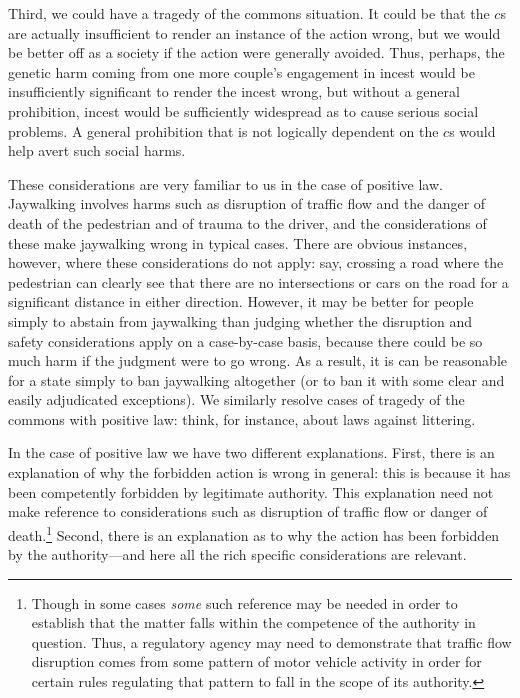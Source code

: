 Third, we could have a tragedy of the commons situation. It could be that the $c$s are actually insufficient
to render an instance of the action wrong, but we would be better off as a society if the action were generally
avoided. Thus, perhaps, the genetic harm coming from one more couple's engagement in incest
would be insufficiently significant to render the incest wrong, but without a general prohibition, incest
would be sufficiently widespread as to cause serious social problems. A general prohibition that is not
logically dependent on the $c$s would help avert such social harms.

These considerations are very familiar to us in the case of positive law. Jaywalking involves harms such as
disruption of traffic flow and the danger of death of the pedestrian and of trauma to the driver, and the
considerations of these make jaywalking wrong in typical cases. There are 
obvious instances, however, where these considerations do not apply: say, crossing a road where the pedestrian
can clearly see that there are no intersections or cars on the road for a significant distance in either 
direction. However, it may be better for people simply to abstain from jaywalking than judging whether the 
disruption and safety considerations apply on a case-by-case basis, because there could be so much harm if 
the judgment were to go wrong. As a result, it is can be reasonable for a state simply to ban jaywalking
altogether (or to ban it with some clear and easily adjudicated exceptions). We similarly resolve cases of
tragedy of the commons with positive law: think, for instance, about laws against littering.

In the case of positive law we have two different explanations. First, there is an explanation of why
the forbidden action is wrong in general: this is because it has been competently forbidden by legitimate authority.
This explanation need not make reference to considerations such as disruption of traffic flow or danger
of death.\footnote{Though in some cases \textit{some} such reference may be needed in order to establish
that the matter falls within the competence of the authority in question. Thus, a regulatory agency may
need to demonstrate that traffic flow disruption comes from some pattern of motor vehicle activity in order 
for certain rules regulating that pattern to fall in the scope of its authority.} Second, there is an 
explanation as to why the action has been forbidden by the authority---and here all the rich specific 
considerations are relevant.

